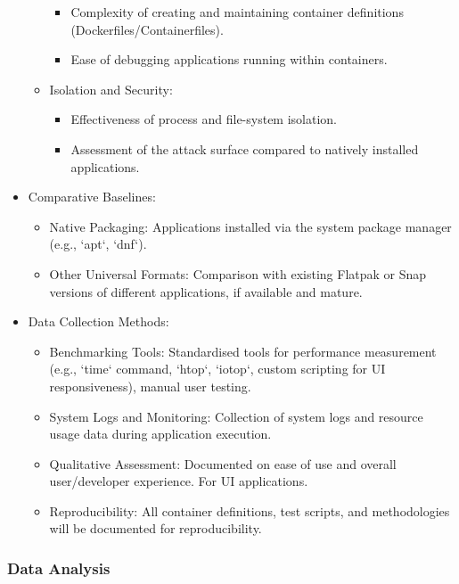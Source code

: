 \documentclass[journal,onecolumn]{IEEEtran}
\begin{document}
\begin{itemize}
\begin{itemize}
        \begin{itemize}
            \item Complexity of creating and maintaining container definitions (Dockerfiles/Containerfiles).
            \item Ease of debugging applications running within containers.
        \end{itemize}
        \item Isolation and Security:
        \begin{itemize}
            \item Effectiveness of process and file-system isolation.
            \item Assessment of the attack surface compared to natively installed applications.
        \end{itemize}
    \end{itemize}
    \item Comparative Baselines:
    \begin{itemize}
        \item Native Packaging: Applications installed via the system package manager (e.g., `apt`, `dnf`).
        \item Other Universal Formats: Comparison with existing Flatpak or Snap versions of different applications, if available and mature.
    \end{itemize}
    \item Data Collection Methods:    
    \begin{itemize}
        \item Benchmarking Tools: Standardised tools for performance measurement (e.g., `time` command, `htop`, `iotop`, custom scripting for UI responsiveness), manual user testing.
        \item System Logs and Monitoring: Collection of system logs and resource usage data during application execution.
        \item Qualitative Assessment: Documented on ease of use and overall user/developer experience. For UI applications.
        \item Reproducibility: All container definitions, test scripts, and methodologies will be documented for reproducibility.
    \end{itemize}
\end{itemize}
\subsubsection{Data Analysis}
\end{document}
